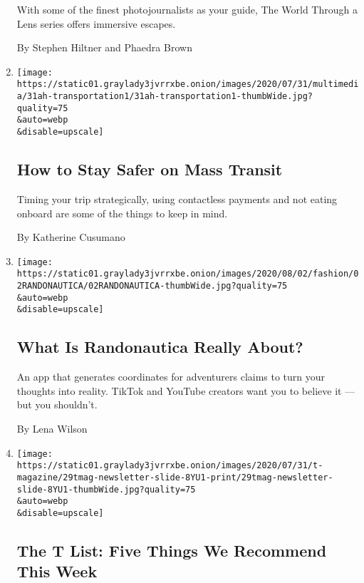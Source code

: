 \begin{enumerate}
  With some of the finest photojournalists as your guide, The World
  Through a Lens series offers immersive escapes.

  By Stephen Hiltner and Phaedra Brown
\item
  \href{/2020/08/01/at-home/coronavirus-public-transportation-subway.html}{}

  \texttt{[image: https://static01.graylady3jvrrxbe.onion/images/2020/07/31/multimedia/31ah-transportation1/31ah-transportation1-thumbWide.jpg?quality=75\\\&auto=webp\\\&disable=upscale]}

  \hypertarget{how-to-stay-safer-on-mass-transit}{%
  \subsection{How to Stay Safer on Mass
  Transit}\label{how-to-stay-safer-on-mass-transit}}

  Timing your trip strategically, using contactless payments and not
  eating onboard are some of the things to keep in mind.

  By Katherine Cusumano
\item
  \href{/2020/07/31/style/randonautica-app.html}{}

  \texttt{[image: https://static01.graylady3jvrrxbe.onion/images/2020/08/02/fashion/02RANDONAUTICA/02RANDONAUTICA-thumbWide.jpg?quality=75\\\&auto=webp\\\&disable=upscale]}

  \hypertarget{what-is-randonautica-really-about}{%
  \subsection{What Is Randonautica Really
  About?}\label{what-is-randonautica-really-about}}

  An app that generates coordinates for adventurers claims to turn your
  thoughts into reality. TikTok and YouTube creators want you to believe
  it --- but you shouldn't.

  By Lena Wilson
\item
  \href{/2020/07/30/t-magazine/the-t-list-five-things-we-recommend-this-week.html}{}

  \texttt{[image: https://static01.graylady3jvrrxbe.onion/images/2020/07/31/t-magazine/29tmag-newsletter-slide-8YU1-print/29tmag-newsletter-slide-8YU1-thumbWide.jpg?quality=75\\\&auto=webp\\\&disable=upscale]}

  \hypertarget{the-t-list-five-things-we-recommend-this-week}{%
  \subsection{The T List: Five Things We Recommend This
  Week}\label{the-t-list-five-things-we-recommend-this-week}}


\end{enumerate}
